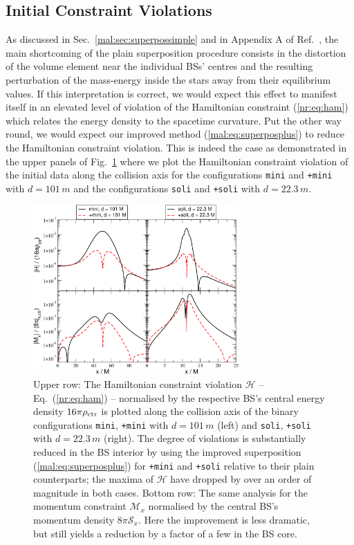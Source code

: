 \subsection{Initial Constraint Violations}
%
As discussed in Sec.~\ref{mal:sec:superpossimple} and in Appendix
A of Ref.~\cite{Helfer:2018vtq},
the main shortcoming of the plain superposition procedure
consists in the distortion of the volume element near the
individual BSs' centres and the resulting perturbation
of the mass-energy inside the stars away from their equilibrium
values. If this interpretation is correct, we would expect
this effect to manifest itself in an elevated level of violation
of the Hamiltonian constraint
(\ref{nr:eq:ham}) which relates the energy density to the
spacetime curvature. Put the other way round, we would
expect our improved method (\ref{mal:eq:superposplus}) to reduce the
Hamiltonian constraint violation. This is indeed the case
as demonstrated in the upper panels of
Fig.~\ref{mal:fig:ham} where we plot the
Hamiltonian constraint violation of the initial data
along the collision axis for the configurations
{\tt mini} and {\tt +mini} with $d=101\,m$ and
the configurations {\tt soli} and {\tt +soli} with
$d=22.3\,m$.
%
\begin{figure}
  \centering
  \includegraphics[width=0.7\textwidth]{malaise_source/constraints.pdf}
  \caption{Upper row: The Hamiltonian constraint violation $\mathcal{H}$ --
  Eq.~(\ref{nr:eq:ham}) -- normalised by the respective BS's
  central energy density $16\pi \rho_{\rm ctr}$
  is plotted along the collision
  axis of the binary configurations {\tt mini}, {\tt +mini}
  with $d=101\,m$ (left) and {\tt soli}, {\tt +soli} with $d=22.3\,m$ (right).
  The degree of violations is substantially reduced in the
  BS interior by using
  the improved superposition (\ref{mal:eq:superposplus})
  for {\tt +mini} and {\tt +soli} relative to their plain
  counterparts; the maxima of $\mathcal{H}$ have dropped by
  over an order of magnitude in both cases.
  Bottom row: The same analysis for the momentum constraint
  $\mathcal{M}_x$
  normalised by the central BS's momentum density
  $8\pi \mathcal{S}_x$. Here the improvement is less dramatic,
  but still yields a reduction by a factor of a few
  in the BS core.
  }
  \label{mal:fig:ham}
\end{figure}
%

